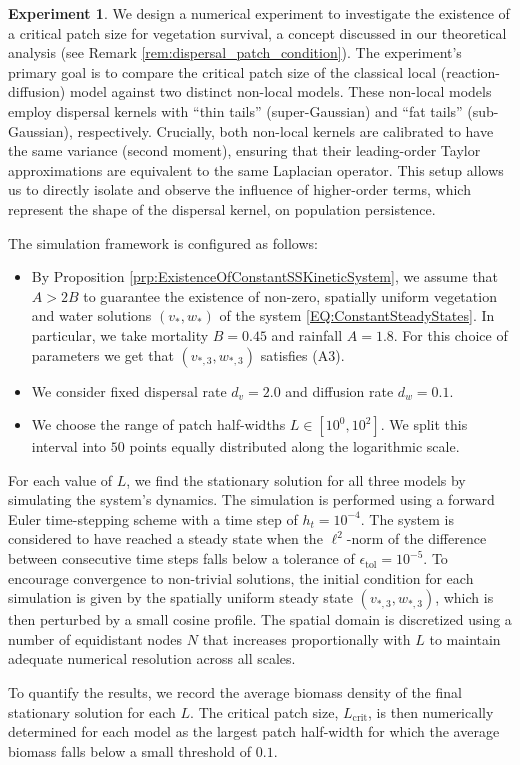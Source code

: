 \documentclass[preprint,12pt]{elsarticle}
\theoremstyle{plain}
\theoremstyle{definition}
\newtheorem{expe}{Experiment}[section]
\theoremstyle{remark}
\begin{document}
\begin{expe}
    We design a numerical experiment to investigate the existence of a critical patch size for vegetation survival, a concept discussed in our theoretical analysis (see Remark \ref{rem:dispersal_patch_condition}). The experiment's primary goal is to compare the critical patch size of the classical local (reaction-diffusion) model against two distinct non-local models. These non-local models employ dispersal kernels with ``thin tails'' (super-Gaussian) and ``fat tails'' (sub-Gaussian), respectively. Crucially, both non-local kernels are calibrated to have the same variance (second moment), ensuring that their leading-order Taylor approximations are equivalent to the same Laplacian operator. This setup allows us to directly isolate and observe the influence of higher-order terms, which represent the shape of the dispersal kernel, on population persistence.
    
    The simulation framework is configured as follows:
    \begin{itemize}
        \item By Proposition \ref{prp:ExistenceOfConstantSSKineticSystem}, we assume that $A > 2B$ to guarantee the existence of non-zero, spatially uniform vegetation and water solutions $(v_*, w_*)$ of the system \eqref{EQ:ConstantSteadyStates}. In particular, we take mortality $B = 0.45$ and rainfall $A = 1.8$. For this choice of parameters we get that $(v_{*, 3}, w_{*, 3})$ satisfies (A3).
        \item We consider fixed dispersal rate $d_v = 2.0$ and diffusion rate $d_w = 0.1$.
        \item We choose the range of patch half-widths $L \in [10^{0}, 10^2]$. We split this interval into $50$ points equally distributed along the logarithmic scale.
    \end{itemize}
    For each value of $L$, we find the stationary solution for all three models by simulating the system's dynamics. The simulation is performed using a forward Euler time-stepping scheme with a time step of $h_t = 10^{-4}$. The system is considered to have reached a steady state when the $\ell^2$-norm of the difference between consecutive time steps falls below a tolerance of $\epsilon_{\text{tol}} = 10^{-5}$. To encourage convergence to non-trivial solutions, the initial condition for each simulation is given by the spatially uniform steady state $(v_{*,3}, w_{*,3})$, which is then perturbed by a small cosine profile. The spatial domain is discretized using a number of equidistant nodes $N$ that increases proportionally with $L$ to maintain adequate numerical resolution across all scales.

    To quantify the results, we record the average biomass density of the final stationary solution for each $L$. The critical patch size, $L_{\text{crit}}$, is then numerically determined for each model as the largest patch half-width for which the average biomass falls below a small threshold of $0.1$.
\end{expe}
\end{document}
